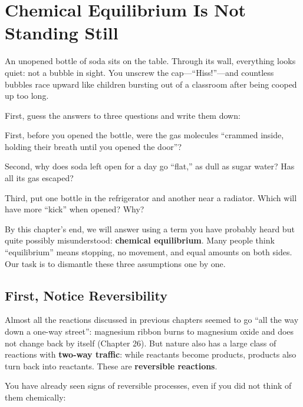 \chapter{Chemical Equilibrium Is Not Standing Still}

\begin{kaichang}
An unopened bottle of soda sits on the table. Through its wall, everything looks quiet: not a bubble in sight. You unscrew the cap---``Hiss!''---and countless bubbles race upward like children bursting out of a classroom after being cooped up too long.

First, guess the answers to three questions and write them down:

First, before you opened the bottle, were the gas molecules ``crammed inside, holding their breath until you opened the door''?

Second, why does soda left open for a day go ``flat,'' as dull as sugar water? Has all its gas escaped?

Third, put one bottle in the refrigerator and another near a radiator. Which will have more ``kick'' when opened? Why?

By this chapter's end, we will answer using a term you have probably heard but quite possibly misunderstood: \textbf{chemical equilibrium}. Many people think ``equilibrium'' means stopping, no movement, and equal amounts on both sides. Our task is to dismantle these three assumptions one by one.
\end{kaichang}

\section{First, Notice Reversibility}

Almost all the reactions discussed in previous chapters seemed to go ``all the way down a one-way street'': magnesium ribbon burns to magnesium oxide and does not change back by itself (Chapter 26). But nature also has a large class of reactions with \textbf{two-way traffic}: while reactants become products, products also turn back into reactants. These are \textbf{reversible reactions}.

You have already seen signs of reversible processes, even if you did not think of them chemically:


